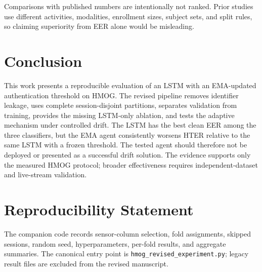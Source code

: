 \documentclass[3p,times,procedia]{elsarticle}
\begin{document}
Comparisons with published numbers are intentionally not ranked. Prior studies
use different activities, modalities, enrollment sizes, subject sets, and split
rules, so claiming superiority from EER alone would be misleading.

\section{Conclusion}

This work presents a reproducible evaluation of an LSTM with an EMA-updated
authentication threshold on HMOG. The revised pipeline removes identifier
leakage, uses complete session-disjoint partitions, separates validation from
training, provides the missing LSTM-only ablation, and tests the adaptive
mechanism under controlled drift. The LSTM has the best clean EER among the
three classifiers, but the EMA agent consistently worsens HTER relative to the
same LSTM with a frozen threshold. The tested agent should therefore not be
deployed or presented as a successful drift solution. The evidence supports only
the measured HMOG protocol; broader effectiveness requires independent-dataset
and live-stream validation.

\section*{Reproducibility Statement}

The companion code records sensor-column selection, fold assignments, skipped
sessions, random seed, hyperparameters, per-fold results, and aggregate
summaries. The canonical entry point is \texttt{hmog\_revised\_experiment.py};
legacy result files are excluded from the revised manuscript.



\end{document}
